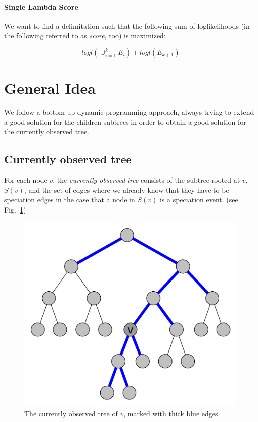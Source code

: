 \documentclass{llncs}
\begin{document}
\paragraph{Single Lambda Score}

We want to find a delimitation such that the following sum of loglikelihoods (in the following referred to as \emph{score}, too) is maximized:

$$logl(\cup_{i=1}^k{E_i}) + logl(E_{k+1})$$

\section{General Idea}

We follow a bottom-up dynamic programming approach, always trying to extend a good solution for the children subtrees in order to obtain a good solution for the currently observed tree.

\subsection{Currently observed tree}

For each node $v$, the \emph{currently observed tree} consists of the subtree rooted at $v$, $S(v)$, and the set of edges where we already know that they have to be speciation edges in the case that a node in $S(v)$ is a speciation event. (see Fig.~\ref{fig:currently_observed_tree})

\begin{figure}[h!]
	\centering
	\includegraphics[scale=0.4]{images/currently_observed_tree.pdf}
	\caption{The currently observed tree of $v$, marked with thick blue edges}
	\label{fig:currently_observed_tree}
\end{figure}
\end{document}
